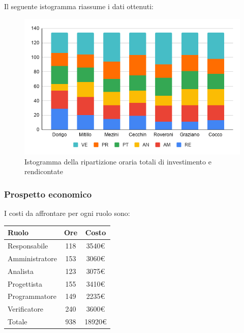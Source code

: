 {{{{{{{{{{{Il seguente istogramma riassume i dati ottenuti:
\begin{figure}[!h]
	\begin{center}
		\includegraphics[width=0.65\linewidth]{../immagini/pdp/istogramma_suddivisione_lavoro.png}
		\caption{Istogramma della ripartizione oraria totali di investimento e rendicontate}
	\end{center}
\end{figure}

\subsubsection{Prospetto economico}\label{PreventivoRiepilogoOreTotaliProspettoEconomico}
I costi da affrontare per ogni ruolo sono:
\quad
\def\tabularxcolumn#1{m{#1}}
{
	\begin{center}
		\renewcommand{\arraystretch}{1.4}
		\begin{tabularx}{7cm}{|X|c|c|}
			\hline
			\rowcolor{airforceblue}
			\textbf{Ruolo} & \textbf{Ore} & \textbf{Costo}\\
			\hline
			Responsabile & 118 & 3540\euro\\
			\hline
			Amministratore & 153 & 3060\euro\\
			\hline
			Analista & 123 & 3075\euro\\
			\hline
			Progettista & 155 & 3410\euro\\
			\hline
			Programmatore & 149 & 2235\euro\\
			\hline
			Verificatore & 240 & 3600\euro\\
			\hline
			Totale & 938 & 18920\euro\\
			\hline
		\end{tabularx}
	\end{center}

}}}}}}}}}}}}
